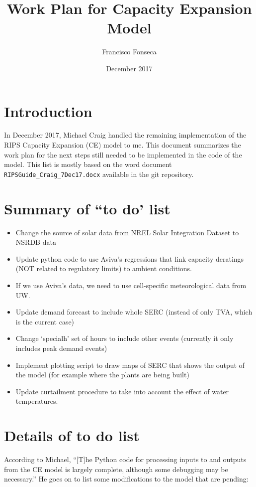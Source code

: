 \documentclass[11pt, oneside]{article}   	%
\title{Work Plan for Capacity Expansion Model}
\author{Francisco Fonseca}
\date{December 2017}							%
\begin{document}
\maketitle
\section{Introduction}

In December 2017, Michael Craig handled the remaining implementation of the RIPS Capacity Expansion (CE) model to me. This document summarizes the work plan for the next steps still needed to be implemented in the code of the model. This list is mostly based on the word document \texttt{RIPSGuide\_Craig\_7Dec17.docx} available in the git repository.

\section{Summary of ``to do' list}

\begin{itemize}
\item Change the source of solar data from NREL Solar Integration Dataset to NSRDB data
\item Update python code to use Aviva's regressions that link capacity deratings (NOT related to regulatory limits) to ambient conditions.
\item If we use Aviva's data, we need to use cell-specific meteorological data from UW.
\item Update demand forecast to include whole SERC (instead of only TVA, which is the current case)
\item Change `specialh' set of hours to include other events (currently it only includes peak demand events)
\item Implement plotting script to draw maps of SERC that shows the output of the model (for example where the plants are being built)
\item Update curtailment procedure to take into account the effect of water temperatures.
\end{itemize}


\section{Details of to do list}

According to Michael, ``[T]he Python code for processing inputs to and outputs from the CE model is largely complete, although some debugging may be necessary.'' He goes on to list some modifications to the model that are pending:
\end{document}

